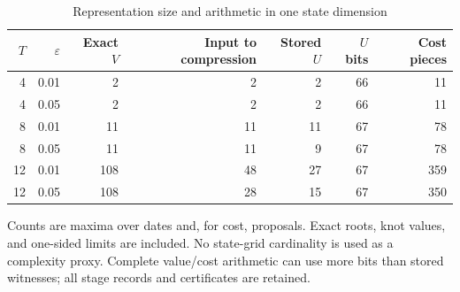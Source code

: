 \begin{table}[htbp]
\centering\footnotesize
\caption{Representation size and arithmetic in one state dimension}\label{tab:geometry}
\begin{tabular}{rrrrrrr}\toprule
$T$ & $\varepsilon$ & Exact $V$ & Input to compression & Stored $U$ & $U$ bits & Cost pieces \\\midrule
4 & 0.01 & 2 & 2 & 2 & 66 & 11 \\
4 & 0.05 & 2 & 2 & 2 & 66 & 11 \\
8 & 0.01 & 11 & 11 & 11 & 67 & 78 \\
8 & 0.05 & 11 & 11 & 9 & 67 & 78 \\
12 & 0.01 & 108 & 48 & 27 & 67 & 359 \\
12 & 0.05 & 108 & 28 & 15 & 67 & 350 \\
\bottomrule\end{tabular}
\par\smallskip\begin{minipage}{.98\textwidth}\footnotesize Counts are maxima over dates and, for cost, proposals. Exact roots, knot values, and one-sided limits are included. No state-grid cardinality is used as a complexity proxy. Complete value/cost arithmetic can use more bits than stored witnesses; all stage records and certificates are retained.\end{minipage}
\end{table}
